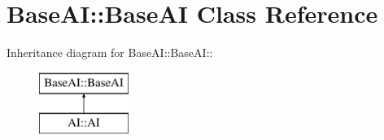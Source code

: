 \hypertarget{classBaseAI_1_1BaseAI}{
\section{BaseAI::BaseAI Class Reference}
\label{classBaseAI_1_1BaseAI}
}
Inheritance diagram for BaseAI::BaseAI::\begin{figure}[H]
\begin{center}
\leavevmode
\includegraphics[height=2cm]{classBaseAI_1_1BaseAI}
\end{center}
\end{figure}
